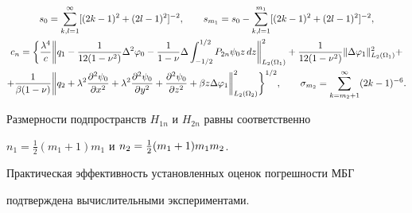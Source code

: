 \begin{gather*}




\allowdisplaybreaks


s_0=\sum^\infty_{k,l=1}[(2k-1)^2+(2l-1)^2]^{-2},\qquad


s_{m_1}=s_0-\sum^{m_1}_{k,l=1}[(2k-1)^2+(2l-1)^2]^{-2},\\


%


c_n=\biggl\{\frac{\lambda^4}{c}\biggl\|q_1-


\frac{1}{12(1-\nu^2)}\Delta^2\varphi_0-\frac{1}{1-\nu}\Delta


\int^{1/2}_{-1/2}P_{2n}\psi_0 z\,dz


\biggr\|^2_{L_2(\Omega_1)}+\frac{1}{12(1-\nu^2)}


\|\Delta\varphi_1\|^2_{L_2(\Omega_1)}+ \\


%


+\frac{1}{\beta(1-\nu)}\biggl\|q_2+\lambda^2


\frac{\partial^2\psi_0}{\partial x^2}+\lambda^2


\frac{\partial^2\psi_0}{\partial y^2}+


\frac{\partial^2\psi_0}{\partial z^2}+\beta z\Delta


\varphi_1\biggr\|^2_{L_2(\Omega_2)}\biggr\}^{1/2},\qquad


\sigma_{m_2}=\sum^\infty_{k=m_2+1}(2k-1)^{-6}.


\end{gather*}


Размерности подпространств $H_{1n}$ и $H_{2n}$ равны соответственно


$n_1=\frac{1}{2}(m_1+1)m_1$ и $n_2=\linebreak \frac{1}{2}(m_1+1)m_1m_2$.





Практическая эффективность установленных оценок погрешности МБГ


подтверждена вычислительными экспериментами.





